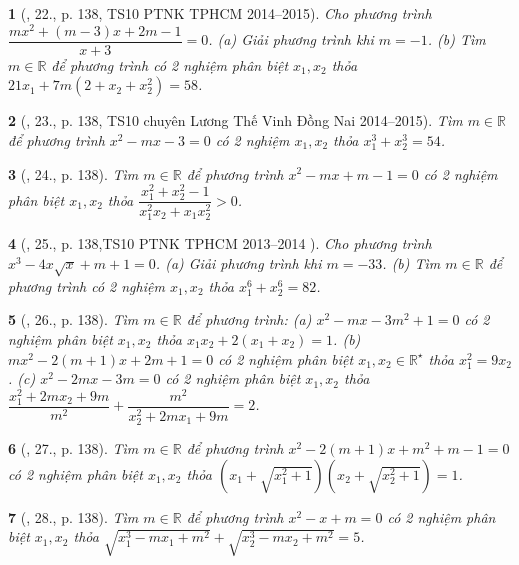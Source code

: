 \documentclass{article}
\newtheorem{baitoan}{}
\begin{document}
\begin{baitoan}[\cite{Thu_Viet_Minh_ptb2}, 22., p. 138, TS10 PTNK TPHCM 2014--2015]
	Cho phương trình $\dfrac{mx^2 + (m - 3)x + 2m - 1}{x + 3} = 0$. (a) Giải phương trình khi $m = -1$. (b) Tìm $m\in\mathbb{R}$ để phương trình có 2 nghiệm phân biệt $x_1,x_2$ thỏa $21x_1 + 7m(2 + x_2 + x_2^2) = 58$.
\end{baitoan}

\begin{baitoan}[\cite{Thu_Viet_Minh_ptb2}, 23., p. 138, TS10 chuyên Lương Thế Vinh Đồng Nai 2014--2015]
	Tìm $m\in\mathbb{R}$ để phương trình $x^2 - mx - 3 = 0$ có 2 nghiệm $x_1,x_2$ thỏa $x_1^3 + x_2^3 = 54$.
\end{baitoan}

\begin{baitoan}[\cite{Thu_Viet_Minh_ptb2}, 24., p. 138]
	Tìm $m\in\mathbb{R}$ để phương trình $x^2 - mx + m - 1 = 0$ có 2 nghiệm phân biệt $x_1,x_2$ thỏa $\dfrac{x_1^2 + x_2^2 - 1}{x_1^2x_2 + x_1x_2^2} > 0$.
\end{baitoan}

\begin{baitoan}[\cite{Thu_Viet_Minh_ptb2}, 25., p. 138,TS10 PTNK TPHCM 2013--2014 ]
	Cho phương trình $x^3 - 4x\sqrt{x} + m + 1 = 0$. (a) Giải phương trình khi $m = -33$. (b) Tìm $m\in\mathbb{R}$ để phương trình có 2 nghiệm $x_1,x_2$ thỏa $x_1^6 + x_2^6 = 82$.
\end{baitoan}

\begin{baitoan}[\cite{Thu_Viet_Minh_ptb2}, 26., p. 138]
	Tìm $m\in\mathbb{R}$ để phương trình: (a) $x^2 - mx - 3m^2 + 1 = 0$ có 2 nghiệm phân biệt $x_1,x_2$ thỏa $x_1x_2 + 2(x_1 + x_2) = 1$. (b) $mx^2 - 2(m + 1)x + 2m + 1 = 0$ có 2 nghiệm phân biệt $x_1,x_2\in\mathbb{R}^\star$ thỏa $x_1^2 = 9x_2$. (c) $x^2 - 2mx - 3m = 0$ có 2 nghiệm phân biệt $x_1,x_2$ thỏa $\dfrac{x_1^2 + 2mx_2 + 9m}{m^2} + \dfrac{m^2}{x_2^2 + 2mx_1 + 9m} = 2$.
\end{baitoan}

\begin{baitoan}[\cite{Thu_Viet_Minh_ptb2}, 27., p. 138]
	Tìm $m\in\mathbb{R}$ để phương trình $x^2 - 2(m + 1)x + m^2 + m - 1 = 0$ có 2 nghiệm phân biệt $x_1,x_2$ thỏa $(x_1 + \sqrt{x_1^2 + 1})(x_2 + \sqrt{x_2^2 + 1}) = 1$.
\end{baitoan}

\begin{baitoan}[\cite{Thu_Viet_Minh_ptb2}, 28., p. 138]
	Tìm $m\in\mathbb{R}$ để phương trình $x^2 - x + m = 0$ có 2 nghiệm phân biệt $x_1,x_2$ thỏa $\sqrt{x_1^3 - mx_1 + m^2} + \sqrt{x_2^3 - mx_2 + m^2} = 5$.
\end{baitoan}
\end{document}
